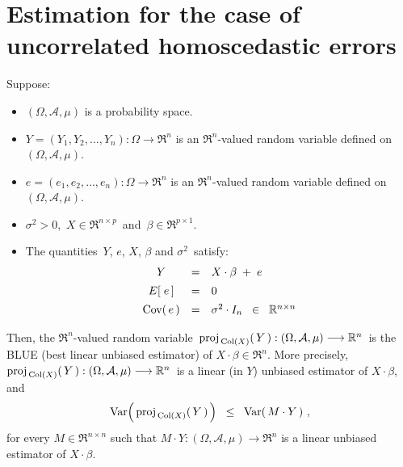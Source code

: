 

\section{Estimation for the case of uncorrelated homoscedastic errors}
\setcounter{theorem}{0}
\setcounter{equation}{0}

\renewcommand{\theenumi}{\roman{enumi}}
\renewcommand{\labelenumi}{\textnormal{(\theenumi)}$\;\;$}


\begin{theorem}
\mbox{}
\vskip 0.1cm
\noindent
Suppose:
\begin{itemize}
\item
	$(\Omega,\mathcal{A},\mu)$ is a probability space.
\item
	$Y = (Y_{1}, Y_{2}, \ldots, Y_{n}) : \Omega \longrightarrow \Re^{n}$ is an $\Re^{n}$-valued random variable
	defined on $(\Omega,\mathcal{A},\mu)$.
\item
	$e = (e_{1}, e_{2}, \ldots, e_{n}) : \Omega \longrightarrow \Re^{n}$ is an $\Re^{n}$-valued random variable
	defined on $(\Omega,\mathcal{A},\mu)$.
\item
	$\sigma^{2} > 0$,\, $X \in \Re^{n \times p}$\, and \,$\beta \in \Re^{p \times 1}$.
\item
	The quantities \,$Y$, $e$, $X$, $\beta$ and $\sigma^{2}$\, satisfy:
	\begin{equation*}
	\begin{array}{ccl}
	Y & = & X \cdot \beta \; + \; e
	\\
	E\!\left[\;e\,\right] &  \overset{{\color{white}\vert}}{=} & 0
	\\
	\Cov\!\left(\,e\,\right) & \overset{{\color{white}\vert}}{=} & \sigma^{2} \cdot I_{n} \;\; \in \;\; \Re^{n \times n}
	\end{array}
	\end{equation*}
\end{itemize}
Then,
	the $\Re^{n}$-valued random variable
	\,$\textnormal{proj}_{\,\textnormal{Col}(X)}\!\left(\,Y\,\right) : (\Omega,\mathcal{A},\mu) \longrightarrow \mathbb{R}^{n}$\,
	is the BLUE (best linear unbiased estimator) of $X \cdot \beta \in \Re^{n}$.
	More precisely,
	\,$\textnormal{proj}_{\,\textnormal{Col}(X)}\!\left(\,Y\,\right) : (\Omega,\mathcal{A},\mu) \longrightarrow \mathbb{R}^{n}$\,
	is a linear (in $Y$) unbiased estimator of $X\cdot\beta$, and
	\begin{equation*}
	\textnormal{Var}\!\left(\,\textnormal{proj}_{\,\textnormal{Col}(X)}\!\left(\,Y\,\right)\,\right)
	\;\; \leq \;\;
		\textnormal{Var}\!\left(\,M \cdot Y\,\right)\,,
	\end{equation*}
	for every $M \in \Re^{n \times n}$ such that
	$M \cdot Y : (\Omega,\mathcal{A},\mu) \longrightarrow \Re^{n}$
	is a linear unbiased estimator of $X \cdot \beta$.
\end{theorem}


